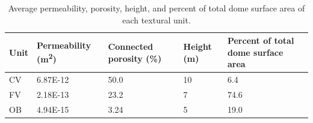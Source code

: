 \documentclass[11pt]{amsart}
\begin{document}
\begin{table}[h]
\center
      \small
      \begin{tabular}{lllll}
      \hline
      \textbf{Unit} & \textbf{Permeability (m\textsuperscript{2})} & \textbf{Connected porosity (\%)}  & \textbf{Height (m)} & \textbf{Percent of total dome surface area} \\  
      \hline
      CV & 6.87E-12 & 50.0 & 10 & 6.4 \\
      FV & 2.18E-13 & 23.2 &  7 & 74.6 \\
      OB & 4.94E-15 & 3.24 & 5 & 19.0 \\ 
\end{tabular}%
\caption{Average permeability, porosity, height, and percent of total dome surface area of each textural unit.} 
\label{tab:UnitPermPoro}
\end{table}

\printbibliography
\end{document}
